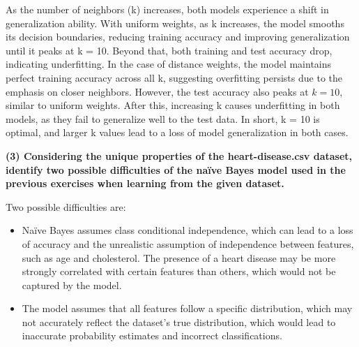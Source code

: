 \documentclass[12pt]{article}
\begin{document}
    \vspace{10pt}
    As the number of neighbors (k) increases, both models experience a shift in generalization ability. With uniform weights, as k increases, the model smooths its decision boundaries, reducing training accuracy and improving generalization until it peaks at k = 10. Beyond that, both training and test accuracy drop, indicating underfitting.
    In the case of distance weights, the model maintains perfect training accuracy across all k, suggesting overfitting persists due to the emphasis on closer neighbors. However, the test accuracy also peaks at $k = 10$, similar to uniform weights. After this, increasing k causes underfitting in both models, as they fail to generalize well to the test data. In short, k = 10 is optimal, and larger k values lead to a loss of model generalization in both cases.


    \vspace{20pt}
    \textbf{(3) Considering the unique properties of the heart-disease.csv dataset, identify two
    possible diﬃculties of the naïve Bayes model used in the previous exercises when learning
    from the given dataset.}

    \vspace{10pt}
    Two possible difficulties are:

    \begin{itemize}
        \item Naïve Bayes assumes class conditional independence, which can lead to a loss of accuracy and the unrealistic assumption of independence between features, such as age and cholesterol. The presence of a heart disease may be more strongly correlated with certain features than others, which would not be captured by the model.
        \item The model assumes that all features follow a specific distribution, which may not accurately reflect the dataset's true distribution, which would lead to inaccurate probability estimates and incorrect classifications.
    \end{itemize}
\end{document}

